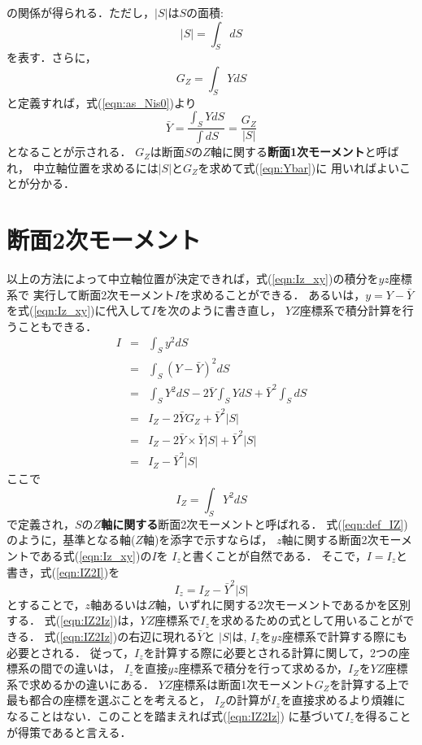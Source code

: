 ﻿\documentclass[10pt,a4j]{jbook}
\begin{document}
の関係が得られる．ただし，$\left| S\right|$は$S$の面積:
\begin{equation}
	\left| S \right| = \int_S dS
	\label{eqn:area}
\end{equation}
を表す．さらに，
\begin{equation}
	G_Z=\int_S YdS 
	\label{eqn:GZ}
\end{equation}
と定義すれば，式(\ref{eqn:as_Nis0})より
\begin{equation}
	\bar Y
	= \frac{\int_S YdS }{\int dS}
	= \frac{G_Z}{\left| S \right|}
	\label{eqn:Ybar}
\end{equation}
となることが示される． 
$G_Z$は断面$S$の$Z$軸に関する{\bf 断面1次モーメント}と呼ばれ，
中立軸位置を求めるには$\left|S\right|$と$G_Z$を求めて式(\ref{eqn:Ybar})に
用いればよいことが分かる．
\section{断面2次モーメント}
以上の方法によって中立軸位置が決定できれば，式(\ref{eqn:Iz_xy})の積分を$yz$座標系で
実行して断面2次モーメント$I$を求めることができる．
あるいは，$y=Y-\bar{Y}$を式(\ref{eqn:Iz_xy})に代入して$I$を次のように書き直し，
$YZ$座標系で積分計算を行うこともできる．
\begin{eqnarray}
	I &= &
	\int_S y^2 dS 
	\nonumber \\
	 &= &
	\int_S \left( Y-\bar{Y}\right)^2 dS 
	\nonumber \\
	 &= &
	\int_S Y^2dS -2\bar{Y}\int_S Y dS +\bar Y^2 \int_S dS
	\nonumber \\
	 &= &
	 I_Z-2\bar{Y}G_Z+\bar{Y}^2\left| S \right|
	\nonumber \\
	 &= &
	 I_Z-2\bar{Y}\times \bar{Y}\left| S \right|+\bar{Y}^2 \left| S \right|
	\nonumber \\
	 &= &
	 I_Z-\bar{Y}^2\left| S \right|
	\label{eqn:IZ2I}
\end{eqnarray}
ここで
\begin{equation}
	I_Z=\int_S Y^2 dS
	\label{eqn:def_IZ}
\end{equation}
で定義され，$S$の{\bf $Z$軸に関する}断面2次モーメントと呼ばれる．
式(\ref{eqn:def_IZ})のように，基準となる軸($Z$軸)を添字で示すならば，
$z$軸に関する断面2次モーメントである式(\ref{eqn:Iz_xy})の$I$を
$I_z$と書くことが自然である．
そこで，$I=I_z$と書き，式(\ref{eqn:IZ2I})を
\begin{equation}
	I_z=I_Z-\bar Y^2 \left| S \right|
	\label{eqn:IZ2Iz}
\end{equation}
とすることで，$z$軸あるいは$Z$軸，いずれに関する2次モーメントであるかを区別する．
式(\ref{eqn:IZ2Iz})は，$YZ$座標系で$I_z$を求めるための式として用いることができる．
式(\ref{eqn:IZ2Iz})の右辺に現れる$\bar{Y}$と
$\left| S\right|$は, $I_z$を$yz$座標系で計算する際にも必要とされる．
従って，$I_z$を計算する際に必要とされる計算に関して，2つの座標系の間での違いは，
$I_z$を直接$yz$座標系で積分を行って求めるか，$I_Z$を$YZ$座標系で求めるかの違いにある．
$YZ$座標系は断面1次モーメント$G_Z$を計算する上で最も都合の座標を選ぶことを考えると，
$I_Z$の計算が$I_z$を直接求めるより煩雑になることはない．このことを踏まえれば式(\ref{eqn:IZ2Iz})
に基づいて$I_z$を得ることが得策であると言える．
\end{document}
